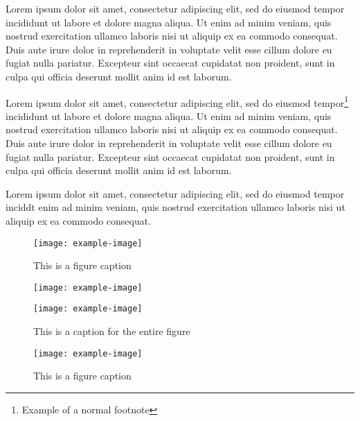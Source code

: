 \documentclass{cup-ino}
\begin{document}
Lorem ipsum dolor sit amet, consectetur adipiscing elit, sed do eiusmod tempor incididunt ut labore et dolore magna aliqua. Ut enim ad minim veniam, quis nostrud exercitation ullamco laboris nisi ut aliquip ex ea commodo consequat. Duis aute irure dolor in reprehenderit in voluptate velit esse cillum dolore eu fugiat nulla pariatur. Excepteur sint occaecat cupidatat non proident, sunt in culpa qui officia deserunt mollit anim id est laborum.

Lorem ipsum dolor sit amet, consectetur adipiscing elit, sed do eiusmod tempor\footnote{Example of a normal footnote} incididunt ut labore et dolore magna aliqua. Ut enim ad minim veniam, quis nostrud exercitation ullamco laboris nisi ut aliquip ex ea commodo consequat. Duis aute irure dolor in reprehenderit in voluptate velit esse cillum dolore eu fugiat nulla pariatur. Excepteur sint occaecat cupidatat non proident, sunt in culpa qui officia deserunt mollit anim id est laborum.

Lorem ipsum dolor sit amet, consectetur adipiscing elit, sed do eiusmod tempor inciddt enim ad minim veniam, quis nostrud exercitation ullamco laboris nisi ut aliquip ex ea commodo consequat. 


\begin{figure}
\centering
\texttt{[image: example-image]}
\caption{This is a figure caption}
\label{fig:example}
\end{figure}


\begin{figure}[bt!]
\begin{minipage}{0.47\textwidth}
\texttt{[image: example-image]}
\end{minipage}
\hfill
\begin{minipage}{0.47\textwidth}
\texttt{[image: example-image]}
\end{minipage}

\caption{This is a caption for the entire figure}
\label{fig:twosubs}
\end{figure}

\begin{sidewaysfigure}
\centering
\texttt{[image: example-image]}
\caption{This is a figure caption}
\label{fig:landscape}
\end{sidewaysfigure}
\end{document}
